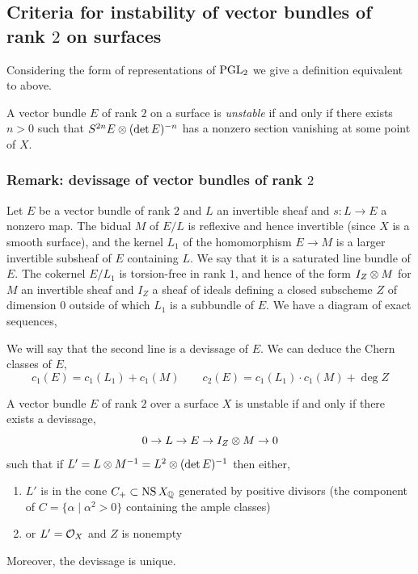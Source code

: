 \documentclass[main.tex]{subfiles}
\begin{document}
\subsection{Criteria for instability of vector bundles of rank $2$ on surfaces}

Considering the form of representations of $\mathrm{PGL}_2$ we give a definition equivalent to above.

\begin{defn}
A vector bundle $E$ of rank $2$ on a surface is \textit{unstable} if and only if there exists $n > 0$ such that $S^{2n} E \otimes (\det{E})^{-n}$ has a nonzero section vanishing at some point of $X$.
\end{defn}

\subsubsection{Remark: devissage of vector bundles of rank $2$}

Let $E$ be a vector bundle of rank $2$ and $L$ an invertible sheaf and $s : L \to E$ a nonzero map. The bidual $M$ of $E/L$ is reflexive and hence invertible (since $X$ is a smooth surface), and the kernel $L_1$ of the homomorphism $E \to M$ is a larger invertible subsheaf of $E$ containing $L$. We say that it is a saturated line bundle of $E$. The cokernel $E/L_1$ is torsion-free in rank $1$, and hence of the form $I_Z \otimes M$ for $M$ an invertible sheaf and $I_Z$ a sheaf of ideals defining a closed subscheme $Z$ of dimension $0$ outside of which $L_1$ is a subbundle of $E$. We have a diagram of exact sequences,
\begin{center}
\end{center}
We will say that the second line is a devissage of $E$. We can deduce the Chern classes of $E$,
\[ c_1(E) = c_1(L_1) + c_1(M) \quad \quad c_2(E) = c_1(L_1) \cdot c_1(M) + \deg{Z} \]

\begin{theorem}
A vector bundle $E$ of rank $2$ over a surface $X$ is unstable if and only if there exists a devissage,
\[ 0 \to L \to E \to I_Z \otimes M \to 0 \]
such that if $L' = L \otimes M^{-1} = L^2 \otimes (\det{E})^{-1}$ then either,
\begin{enumerate}
\item $L'$ is in the cone $C_+ \subset \operatorname{\mathrm{NS}}{X}_{\mathbb{Q}}$ generated by positive divisors (the component of $C = \{ \alpha \mid \alpha^2 > 0\}$ containing the ample classes)
\item or $L' = \mathcal{O}_{X}$ and $Z$ is nonempty
\end{enumerate}
Moreover, the devissage is unique.
\end{theorem}
\end{document}
